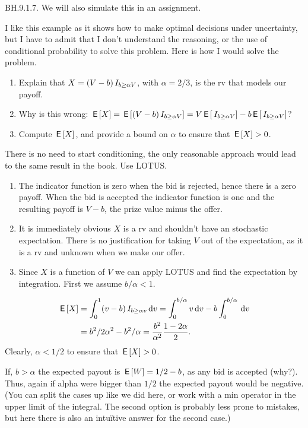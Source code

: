 \begin{exercise}
BH.9.1.7. We will also simulate this in an assignment.

I  like this example as it  shows how to make optimal decisions under uncertainty, but I have to admit that I don't understand the reasoning, or the use of conditional probability to solve this problem. Here is how I would solve the problem.
\begin{enumerate}
\item Explain that $X=(V-b)\,I_{b \geq \alpha V}$, with $\alpha=2/3$, is the rv that models our payoff.
\item Why is this wrong: $\,\mathsf{E}\left[X\right] = \,\mathsf{E}\left[(V-b)\,I_{b \geq \alpha V}\right] = V \,\mathsf{E}\left[\,I_{b \geq \alpha V}\right] -b \,\mathsf{E}\left[\,I_{b \geq \alpha V}\right]$?
\item Compute $\,\mathsf{E}\left[X\right]$, and provide a bound on $\alpha$ to ensure that $\,\mathsf{E}\left[X\right] > 0$.
\end{enumerate}
\begin{hint}
  There is no need to start conditioning, the only reasonable approach would lead to the same result in the book. Use LOTUS.
\end{hint}
  
\begin{solution}
\begin{enumerate}
  \item The indicator function is zero when the bid is rejected, hence there is a zero payoff. When the bid is accepted the indicator function is one and the resulting payoff is $V-b$, the prize value minus the offer.
  \item It is immediately obvious $X$ is a rv and shouldn't have an stochastic expectation. There is no justification for taking $V$ out of the expectation, as it is a rv and unknown when we make our offer.
  \item Since $X$ is a function of $V$ we can apply LOTUS and find the expectation by integration. First we assume $b/\alpha < 1$.
\end{enumerate}
\begin{align*}
\,\mathsf{E}\left[X\right] &= \int_0^1 (v-b) \,I_{b\geq \alpha v} \,\textrm{d}v = \int_0^{b/\alpha} v \,\textrm{d}v - b \int_0^{b/\alpha}  \,\textrm{d}v \\
  &= b^2/2\alpha^2 - b^2/\alpha = \frac{b^{2}}{\alpha^{2}} \frac{1-2\alpha}{2}.
\end{align*}
Clearly, $\alpha<1/2$ to ensure that $\,\mathsf{E}\left[X\right] > 0$.

If, $b>\alpha$ the expected payout is $\,\mathsf{E}\left[W\right] = 1/2 -b $, as any bid is accepted (why?). Thus, again if alpha were bigger than $1/2$ the expected payout would be negative. 
(You can split the cases up like we did here, or work with a min operator in the upper limit of the integral. The second option is probably less prone to mistakes, but here there is also an intu\"itive answer for the second case.) 
\end{solution}
\end{exercise}


